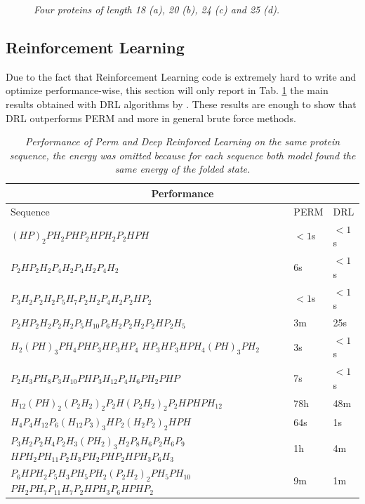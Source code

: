 \begin{figure}[H]
    \caption{\emph{Four proteins of length 18 (a), 20 (b), 24 (c) and 25 (d).}}
    \label{fig:cpsp}
\end{figure}

\subsection{Reinforcement Learning}
Due to the fact that Reinforcement Learning code is extremely hard to write and optimize performance-wise, this section will only report in Tab. \ref{tab:RL} the main results obtained with DRL algorithms by \cite{jafari2020solving}.
These results are enough to show that DRL outperforms PERM and more in general brute force methods.

\FloatBarrier
\begin{table}[H]
\centering
\begin{tabular}[c]{ |p{8cm}||p{2cm}||p{2cm}|}
 \hline
 \multicolumn{3}{|c|}{Performance} \\
 \hline
 Sequence  & PERM & DRL\\
 \hline
$(HP)_2PH_2PHP_2HPH_2P_2HPH$ & $< 1$s & $< 1$s\\
 \hline
$P_2HP_2H_2P_4H_2P_4H_2P_4H_2$ & 6s  & $< 1$s\\
 \hline
$P_3H_2P_2H_2P_5H_7P_2H_2P_4H_2P_2HP_2$ & $< 1$s & $< 1$s\\
\hline
$P_2HP_2H_2P_2H_2P_5H_{10}P_6H_2P_2H_2P_2HP_2H_5$ & 3m & 25s\\
\hline
$H_2(PH)_3PH_4PHP_3HP_3HP_4$
$HP_3HP_3HPH_4(PH)_3PH_2$ & 3s & $< 1$s\\
\hline
$P_2H_3PH_8P_3H_{10}PHP_3H_{12}P_4H_6PH_2PHP$ & 7s & $< 1$s\\
\hline 
$H_{12}(PH)_2(P_2H_2)_2P_2H(P_2H_2)_2P_2HPHPH_{12}$ & 78h & 48m\\
\hline
$H_4P_4H_{12}P_6(H_{12}P_3)_3HP_2(H_2P_2)_2HPH$ & 64s & 1s\\
\hline
$P_3H_2P_2H_4P_2H_3(PH_2)_3H_2P_8H_6P_2H_6P_9$
$HPH_2PH_{11}P_2H_3PH_2PHP_2HPH_3P_6H_3$ & 1h & 4m\\
\hline
$P_6HPH_2P_5H_3PH_5PH_2(P_2H_2)_2PH_5PH_{10}$
$PH_2PH_7P_{11}H_7P_2HPH_3P_6HPHP_2$ & 9m & 1m\\
\hline

\end{tabular}\\
\caption{\emph{Performance of Perm and Deep Reinforced Learning on the same protein sequence, the energy was omitted because for each sequence both model found the same energy of the folded state.}}
\label{tab:RL}
\end{table}

\FloatBarrier

